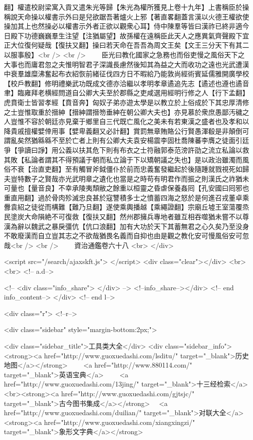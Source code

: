 翻】權遣校尉梁寓入貢又遣朱光等歸【朱光為權所獲見上卷十九年】上書稱臣於操稱說天命操以權書示外曰是兒欲踞吾著爐火上邪【著直畧翻蓋言漢以火德王權欲使操加其上也然操必以權書示外者正欲以觀衆心耳】侍中陳羣等皆曰漢祚已終非適今日殿下功德巍巍羣生注望【注猶屬望】故孫權在遠稱臣此天人之應異氣齊聲殿下宜正大位復何疑哉【復扶又翻】操曰若天命在吾吾為周文王矣【文王三分天下有其二以服事殷】<br />
<br />
　　臣光曰教化國家之急務也而俗吏慢之風俗天下之大事也而庸君忽之夫惟明智君子深識長慮然後知其為益之大而收功之遠也光武遭漢中衰羣雄糜沸奮起布衣紹恢前緒征伐四方日不暇給乃能敦尚經術賓延儒雅開廣學校【校戶教翻】修明禮樂武功既成文德亦洽繼以孝明孝章遹追先志【遹述也遵也遹音聿】臨雍拜老横經問道自公卿大夫至於郡縣之吏咸選用經明行修之人【行下孟翻】虎賁衛士皆習孝經【賁音奔】匈奴子弟亦遊太學是以教立於上俗成於下其忠厚清修之士豈惟取重於搢紳【搢紳謂搢笏垂紳在朝公卿大夫也】亦見慕於衆庶愚鄙汚穢之人豈惟不容於朝廷亦見棄于鄉里自三代既亡風化之美未有若東漢之盛者也及孝和以降貴戚擅權嬖倖用事【嬖卑義翻又必計翻】賞罰無章賄賂公行賢愚渾殽是非顛倒可謂亂矣然猶緜緜不至於亡者上則有公卿大夫袁安楊震李固杜喬陳蕃李膺之徒面引廷爭【爭讀曰諍】用公義以扶其危下則有布衣之士符融郭泰范滂許劭之流立私論以救其敗【私論者謂其不得預議于朝而私立論于下以矯朝議之失也】是以政治雖濁而風俗不衰【治直吏翻】至有觸冒斧鉞僵仆於前而忠義奮發繼起於後隨踵就戮視死如歸夫豈特數子之賢哉亦光武明章之遺化也當是之時苟有明君作而振之則漢氏之祚猶未可量也【量音良】不幸承陵夷頹敝之餘重以桓靈之昏虐保養姦囘【孔安國曰囘邪也重直用翻】過於骨肉殄滅忠良甚於寇讐積多士之憤蓄四海之怒於是何進召戎董卓乘釁袁紹之徒從而構難【難乃旦翻】遂使乘輿播越【乘繩證翻】宗廟丘墟王室蕩覆烝民塗炭大命隕絶不可復救【復扶又翻】然州郡擁兵專地者雖互相吞噬猶未嘗不以尊漢為辭以魏武之暴戾彊伉【伉口浪翻】加有大功於天下其蓄無君之心久矣乃至没身不敢廢漢而自立豈其志之不欲哉猶畏名義而自抑也由是觀之教化安可慢風俗安可忽哉<br />
<br />
　　資治通鑑卷六十八  <br>
   </div> 

<script src="/search/ajaxskft.js"> </script>
 <div class="clear"></div>
<br>
<br>
 <!-- a.d-->

 <!--
<div class="info_share">
</div> 
-->
 <!--info_share--></div>   <!-- end info_content-->
  </div> <!-- end l-->

<div class="r">   <!--r-->



<div class="sidebar"  style="margin-bottom:2px;">

 
<div class="sidebar_title">工具类大全</div>
<div class="sidebar_info">
<strong><a href="http://www.guoxuedashi.com/lsditu/" target="_blank">历史地图</a></strong>　　
<a href="http://www.880114.com/" target="_blank">英语宝典</a>　　
<a href="http://www.guoxuedashi.com/13jing/" target="_blank">十三经检索</a>　
<br><strong><a href="http://www.guoxuedashi.com/gjtsjc/" target="_blank">古今图书集成</a></strong>　
<a href="http://www.guoxuedashi.com/duilian/" target="_blank">对联大全</a>　<strong><a href="http://www.guoxuedashi.com/xiangxingzi/" target="_blank">象形文字典</a></strong>　

